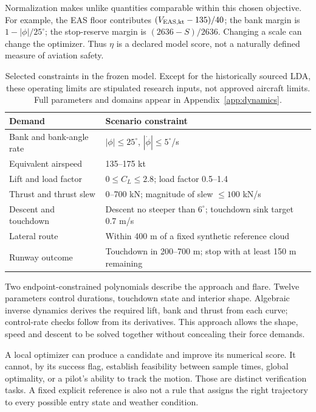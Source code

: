 Normalization makes unlike quantities comparable within this chosen objective. For example, the EAS floor contributes $(V_{\rm EAS,kt}-135)/40$; the bank margin is $1-|\phi|/25^\circ$; the stop-reserve margin is $(2636-S)/2636$. Changing a scale can change the optimizer. Thus $\eta$ is a declared model score, not a naturally defined measure of aviation safety.

\begin{table}[H]\small
\caption{Selected constraints in the frozen model. Except for the historically sourced LDA, these operating limits are stipulated research inputs, not approved aircraft limits. Full parameters and domains appear in Appendix~\ref{app:dynamics}.}
\begin{tabularx}{\textwidth}{@{}p{}X@{}}\toprule
Demand & Scenario constraint\\\midrule
Bank and bank-angle rate & $|\phi|\leq25^\circ$, $|\dot\phi|\leq5^\circ$/s\\
Equivalent airspeed & 135--175 kt\\
Lift and load factor & $0\leq C_L\leq2.8$; load factor 0.5--1.4\\
Thrust and thrust slew & 0--700 kN; magnitude of slew $\leq100$ kN/s\\
Descent and touchdown & Descent no steeper than $6^\circ$; touchdown sink target 0.7 m/s\\
Lateral route & Within 400 m of a fixed synthetic reference cloud\\
Runway outcome & Touchdown in 200--700 m; stop with at least 150 m remaining\\\bottomrule
\end{tabularx}\end{table}

Two endpoint-constrained polynomials describe the approach and flare. Twelve parameters control durations, touchdown state and interior shape. Algebraic inverse dynamics derives the required lift, bank and thrust from each curve; control-rate checks follow from its derivatives. This approach allows the shape, speed and descent to be solved together without concealing their force demands.

A local optimizer can produce a candidate and improve its numerical score. It cannot, by its success flag, establish feasibility between sample times, global optimality, or a pilot's ability to track the motion. Those are distinct verification tasks. A fixed explicit reference is also not a rule that assigns the right trajectory to every possible entry state and weather condition.
\clearpage
